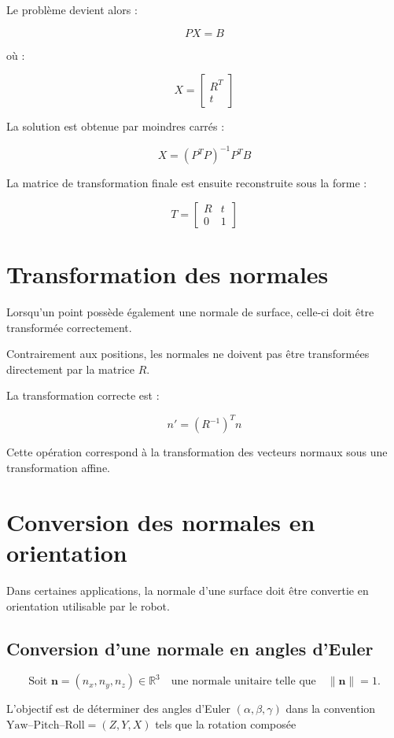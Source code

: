 \documentclass[a4paper,11pt]{article}
\begin{document}
Le problème devient alors :

\[
P X = B
\]

où :

\[
X =
\begin{bmatrix}
R^T \\
t
\end{bmatrix}
\]

La solution est obtenue par moindres carrés :

\[
X = (P^T P)^{-1} P^T B
\]

La matrice de transformation finale est ensuite reconstruite sous la forme :

\[
T =
\begin{bmatrix}
R & t \\
0 & 1
\end{bmatrix}
\]

\section{Transformation des normales}

Lorsqu’un point possède également une normale de surface, celle-ci doit être transformée correctement.

Contrairement aux positions, les normales ne doivent pas être transformées directement par la matrice $R$.

La transformation correcte est :

\[
n' = (R^{-1})^T n
\]

Cette opération correspond à la transformation des vecteurs normaux sous une transformation affine.

\section{Conversion des normales en orientation}

Dans certaines applications, la normale d’une surface doit être convertie en orientation utilisable par le robot.

\subsection{Conversion d'une normale en angles d'Euler}

\[
\text{Soit } \mathbf{n} = (n_x, n_y, n_z) \in \mathbb{R}^3
\quad\text{une normale unitaire telle que}\quad
\|\mathbf{n}\| = 1.
\]

L'objectif est de déterminer des angles d'Euler 
\((\alpha, \beta, \gamma)\) dans la convention 
\(\text{Yaw--Pitch--Roll} = (Z,Y,X)\)
tels que la rotation composée
\end{document}
